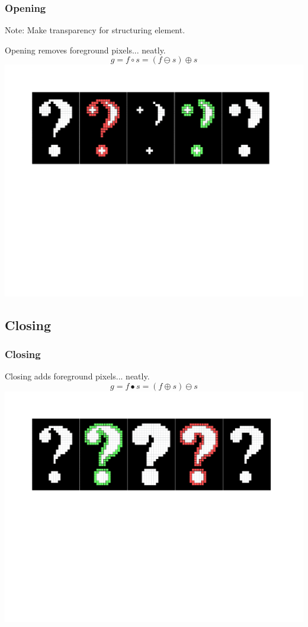 \documentclass{beamer}
\begin{document}
\begin{frame}
\frametitle{Opening}
{\Large Note: Make transparency for structuring element.}
\begin{center}
Opening removes foreground pixels... neatly.
\begin{equation*}
g = f \circ s = (f \ominus s) \oplus s
\end{equation*}
\includegraphics[width=1\textwidth,trim={0 0 0 0.5in},clip]{opening}
\end{center}
\end{frame}

\subsection[Closing]{Closing}

\begin{frame}
\frametitle{Closing}
\begin{center}
Closing adds foreground pixels... neatly.
\begin{equation*}
g = f \bullet s = (f \oplus s) \ominus s
\end{equation*}
\includegraphics[width=1\textwidth,trim={0 0 0 0.5in},clip]{closing}
\end{center}
\end{frame}
\end{document}
